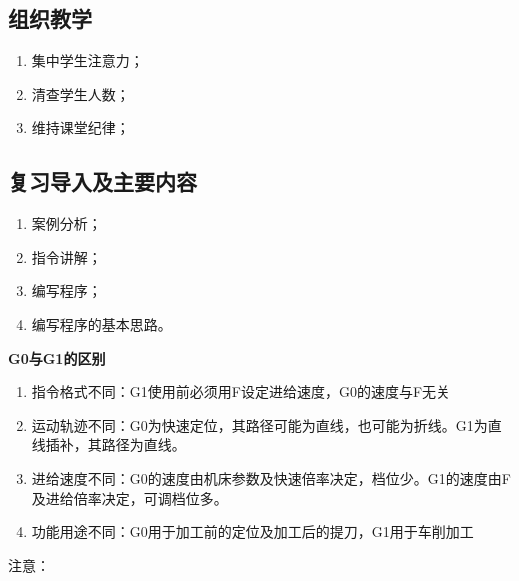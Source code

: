 \jxhj{%
	}

\makeshouye %

\subsection{组织教学}
\begin{enumerate}[1、]
	\item 集中学生注意力；
	\item 清查学生人数；
	\item 维持课堂纪律；
\end{enumerate}
\subsection{复习导入及主要内容}
\begin{enumerate}[1、]
\item 案例分析；
\item 指令讲解；
\item 编写程序；
\item 编写程序的基本思路。
\end{enumerate}


\textbf{G0与G1的区别}

\begin{enumerate}[1、]
\item 指令格式不同：G1使用前必须用F设定进给速度，G0的速度与F无关 
\item 运动轨迹不同：G0为快速定位，其路径可能为直线，也可能为折线。G1为直线插补，其路径为直线。
\item 进给速度不同：G0的速度由机床参数及快速倍率决定，档位少。G1的速度由F及进给倍率决定，可调档位多。
\item 功能用途不同：G0用于加工前的定位及加工后的提刀，G1用于车削加工
\end{enumerate}
注意：

